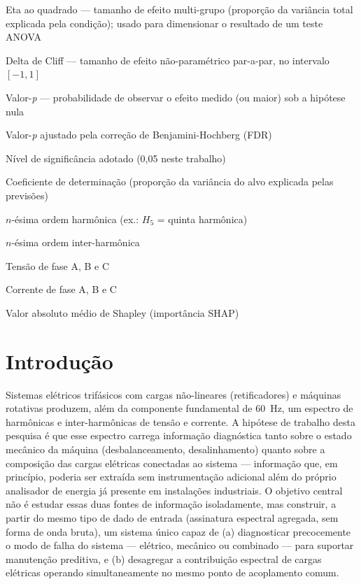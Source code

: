 \documentclass[12pt,a4paper]{report}
\begin{document}
\begin{description}[style=multiline,leftmargin=3.2cm,font=\normalfont\bfseries]
\item[$\eta^2$] Eta ao quadrado — tamanho de efeito multi-grupo (proporção da variância total explicada pela condição); usado para dimensionar o resultado de um teste ANOVA
\item[$\delta$] Delta de Cliff — tamanho de efeito não-paramétrico par-a-par, no intervalo $[-1, 1]$
\item[$p$] Valor-\emph{p} — probabilidade de observar o efeito medido (ou maior) sob a hipótese nula
\item[$p_{\text{adj}}$] Valor-\emph{p} ajustado pela correção de Benjamini-Hochberg (FDR)
\item[$\alpha$] Nível de significância adotado (0,05 neste trabalho)
\item[$R^2$] Coeficiente de determinação (proporção da variância do alvo explicada pelas previsões)
\item[$H_n$] $n$-ésima ordem harmônica (ex.: $H_5$ = quinta harmônica)
\item[$IH_n$] $n$-ésima ordem inter-harmônica
\item[$V_a, V_b, V_c$] Tensão de fase A, B e C
\item[$I_a, I_b, I_c$] Corrente de fase A, B e C
\item[$|\phi|$] Valor absoluto médio de Shapley (importância SHAP)
\end{description}

\chapter{Introdução}

Sistemas elétricos trifásicos com cargas não-lineares (retificadores) e
máquinas rotativas produzem, além da componente fundamental de 60~Hz, um
espectro de harmônicas e inter-harmônicas de tensão e corrente. A hipótese de
trabalho desta pesquisa é que esse espectro carrega informação diagnóstica
tanto sobre o estado mecânico da máquina (desbalanceamento, desalinhamento)
quanto sobre a composição das cargas elétricas conectadas ao sistema —
informação que, em princípio, poderia ser extraída sem instrumentação
adicional além do próprio analisador de energia já presente em instalações
industriais. O objetivo central não é estudar essas duas fontes de
informação isoladamente, mas construir, a partir do mesmo tipo de dado de
entrada (assinatura espectral agregada, sem forma de onda bruta), um sistema
único capaz de (a) diagnosticar precocemente o modo de falha do sistema —
elétrico, mecânico ou combinado — para suportar manutenção preditiva, e (b)
desagregar a contribuição espectral de cargas elétricas operando
simultaneamente no mesmo ponto de acoplamento comum.
\end{document}
